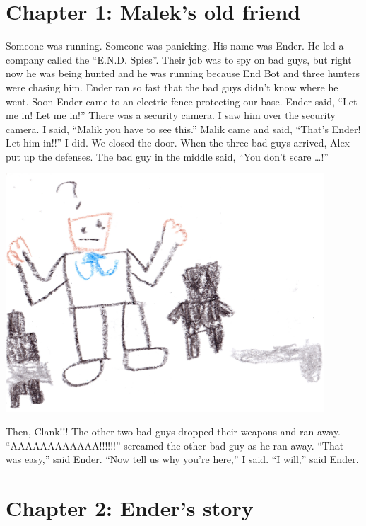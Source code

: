 \documentclass[12pt,oneside]{krantz}
\begin{document}
\hypertarget{chapter-1-maleks-old-friend}{%
\chapter*{Chapter 1: Malek's old
friend}\label{chapter-1-maleks-old-friend}}


Someone was running. Someone was panicking. His name was Ender. He led a
company called the ``E.N.D. Spies''. Their job was to spy on bad guys,
but right now he was being hunted and he was running because End Bot and
three hunters were chasing him. Ender ran so fast that the bad guys
didn't know where he went. Soon Ender came to an electric fence
protecting our base. Ender said, ``Let me in! Let me in!'' There was a
security camera. I saw him over the security camera. I said, ``Malik you
have to see this.'' Malik came and said, ``That's Ender! Let him in!!''
I did. We closed the door. When the three bad guys arrived, Alex put up
the defenses. The bad guy in the middle said, ``You don't scare
\ldots{}!''

\includegraphics[width=4.6875in,height=\textheight]{img/scared.jpg}

\clearpage

Then, Clank!!! The other two bad guys dropped their weapons and ran
away. ``AAAAAAAAAAAA!!!!!!'' screamed the other bad guy as he ran away.
``That was easy,'' said Ender. ``Now tell us why you're here,'' I said.
``I will,'' said Ender.

\hypertarget{chapter-2-enders-story}{%
\chapter*{Chapter 2: Ender's story}\label{chapter-2-enders-story}}
\end{document}
